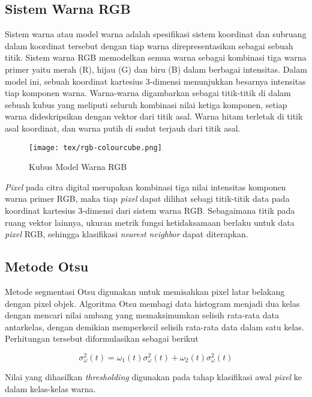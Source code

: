 \documentclass[laporan.tex]{subfiles}
\begin{document}
\subsection{Sistem Warna RGB}
Sistem warna atau model warna adalah spesifikasi sistem koordinat dan subruang dalam koordinat tersebut dengan tiap warna direpresentasikan sebagai sebuah titik. Sistem warna RGB memodelkan semua warna sebagai kombinasi tiga warna primer yaitu merah (R), hijau (G) dan biru (B) dalam berbagai intensitas. Dalam model ini, sebuah koordinat kartesius 3-dimensi menunjukkan besarnya intensitas tiap komponen warna. Warna-warna digambarkan sebagai titik-titik di dalam sebuah kubus yang meliputi seluruh kombinasi nilai ketiga komponen, setiap warna dideskripsikan dengan vektor dari titik asal. Warna hitam terletak di titik asal koordinat, dan warna putih di sudut terjauh dari titik asal.

\begin{figure}[h]
\centering
\texttt{[image: tex/rgb-colourcube.png]}
\caption{Kubus Model Warna RGB}
\end{figure}

\emph{Pixel} pada citra digital merupakan kombinasi tiga nilai intensitas komponen warna primer RGB, maka tiap \emph{pixel} dapat dilihat sebagi titik-titik data pada koordinat kartesius 3-dimensi dari sistem warna RGB. Sebagaimana titik pada ruang vektor lainnya, ukuran metrik fungsi ketidaksamaan berlaku untuk data \emph{pixel} RGB, sehingga klasifikasi \emph{nearest neighbor} dapat diterapkan.


\subsection{Metode Otsu}

Metode segmentasi Otsu digunakan untuk memisahkan pixel latar belakang dengan pixel objek. Algoritma Otsu membagi data histogram menjadi dua kelas dengan mencari nilai ambang yang memaksimumkan selisih rata-rata data antarkelas, dengan demikian memperkecil selisih rata-rata data dalam satu kelas. Perhitungan tersebut diformulasikan sebagai berikut

\begin{equation}
	\sigma_{\omega}^2 (t) = \omega_1 (t) \sigma_{\omega}^2 (t) + \omega_2 (t) \sigma_{\omega}^2 (t)
\end{equation}

Nilai yang dihasilkan \emph{thresholding} digunakan pada tahap klasifikasi awal \emph{pixel} ke dalam kelas-kelas warna.
\end{document}
